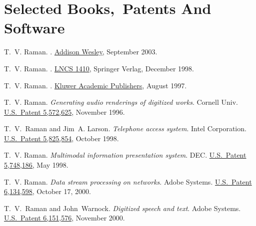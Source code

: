 \documentclass{article}
\begin{document}
\section*{Selected Books,\ Patents And Software}
\begin{plainbibliography}{}
 T.~V. Raman.  .
\newblock \href{http://www.amazon.com/exec/obidos/ASIN/0321154991}%
{Addison Wesley}, September 2003.

 T.~V. Raman.  .  \newblock
\href{http://link.springer-ny.com/link/service/series/0558/tocs/t1410.htm}%
{LNCS 1410}, Springer Verlag, December 1998.

 T.~V. Raman.  .
\newblock \href{http://www.cs.cornell.edu/home/raman/aui/aui.html}%
{Kluwer Academic Publishers}, August 1997.

 T.~V. Raman.  \newblock
  \emph{Generating audio renderings of digitized works}.
  \newblock Cornell Univ.
\newblock \href{http://patft.uspto.gov/netacgi/nph-Parser?TERM1=5,572,625&Sect1=PTO1&Sect2=HITOFF&d=PALL&p=1&u=\%2Fnetahtml\%2Fsrchnum.htm&r=0&f=S&l=50}%
{U.S.\ Patent 5,572,625}, November 1996.

 T.\ V.\ Raman and Jim~A. Larson.
  \newblock \emph{Telephone access system}.  \newblock Intel
  Corporation.
\newblock \href{http://patft.uspto.gov/netacgi/nph-Parser?TERM1=5,825,854&Sect1=PTO1&Sect2=HITOFF&d=PALL&p=1&u=\%2Fnetahtml\%2Fsrchnum.htm&r=0&f=S&l=50}%
{U.S.\ Patent 5,825,854}, October 1998.

 T.~V. Raman.  \newblock
  \emph{Multimodal information presentation system}.  \newblock
  DEC.
\newblock \href{http://patft.uspto.gov/netacgi/nph-Parser?TERM1=5,748,186&Sect1=PTO1&Sect2=HITOFF&d=PALL&p=1&u=\%2Fnetahtml\%2Fsrchnum.htm&r=0&f=S&l=50}%
{U.S.\ Patent 5,748,186,} May 1998.

 T.~V. Raman.  \newblock \emph{Data
    stream processing on networks}.  \newblock Adobe Systems.
\newblock \href{http://patft.uspto.gov/netacgi/nph-Parser?TERM1=6,134,598&Sect1=PTO1&Sect2=HITOFF&d=PALL&p=1&u=\%2Fnetahtml\%2Fsrchnum.htm&r=0&f=S&l=50}%
{U.S.\ Patent 6,134,598}, October 17, 2000.

 T.~V.\ Raman and John~Warnock.
  \newblock \emph{Digitized speech and text}.  \newblock Adobe
  Systems.
\newblock \href{http://patft.uspto.gov/netacgi/nph-Parser?TERM1=6,151,576&Sect1=PTO1&Sect2=HITOFF&d=PALL&p=1&u=\%2Fnetahtml\%2Fsrchnum.htm&r=0&f=S&l=50}%
{U.S.\ Patent 6,151,576}, November 2000.


\end{plainbibliography}
\end{document}
